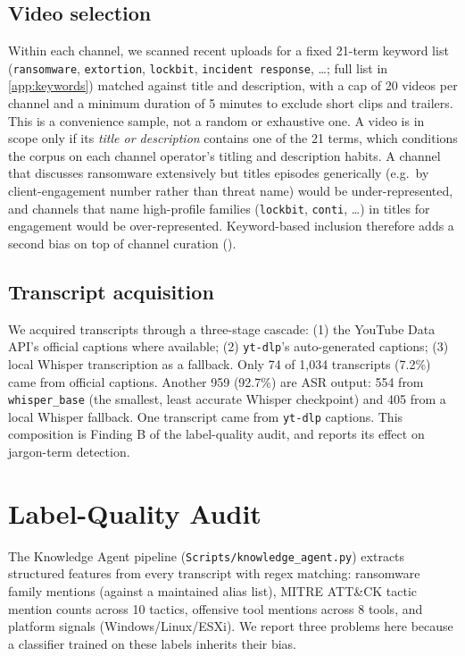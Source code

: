 \documentclass[preprint,12pt]{elsarticle}
\begin{document}
\subsection{Video selection}
Within each channel, we scanned recent uploads for a fixed 21-term keyword
list (\texttt{ransomware}, \texttt{extortion}, \texttt{lockbit},
\texttt{incident response}, \dots; full list in \ref{app:keywords}) matched
against title and description, with a cap of 20 videos per channel and a
minimum duration of 5 minutes to exclude short clips and trailers. This is a
convenience sample, not a random or exhaustive one. A video is in scope only
if its \emph{title or description} contains one of the 21 terms, which
conditions the corpus on each channel operator's titling and description
habits. A channel that discusses ransomware extensively but titles episodes
generically (e.g.\ by client-engagement number rather than threat name)
would be under-represented, and channels that name high-profile families
(\texttt{lockbit}, \texttt{conti}, \dots) in titles for engagement would be
over-represented. Keyword-based inclusion therefore adds a second bias on
top of channel curation ().

\subsection{Transcript acquisition}
\label{sec:transcripts}
We acquired transcripts through a three-stage cascade: (1) the YouTube Data
API's official captions where available; (2) \texttt{yt-dlp}'s
auto-generated captions; (3) local Whisper transcription
\citep{radford2023whisper} as a fallback. Only 74 of 1{,}034 transcripts
(7.2\%) came from official captions. Another 959 (92.7\%) are ASR output:
554 from \texttt{whisper\_base} (the smallest, least accurate Whisper
checkpoint) and 405 from a local Whisper fallback. One transcript came from
\texttt{yt-dlp} captions. This composition is Finding B of the label-quality
audit, and  reports its effect on jargon-term detection.

\section{Label-Quality Audit}
\label{sec:audit}

The Knowledge Agent pipeline (\texttt{Scripts/knowledge\_agent.py})
extracts structured features from every transcript with regex matching:
ransomware family mentions (against a maintained alias list), MITRE
ATT\&CK tactic mention counts across 10 tactics, offensive tool mentions
across 8 tools, and platform signals (Windows/Linux/ESXi). We report three
problems here because a classifier trained on these labels inherits their
bias.
\end{document}
